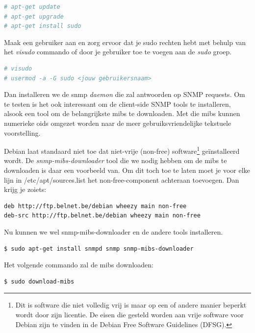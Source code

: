 \begin{lstlisting}[language=bash]
# apt-get update
# apt-get upgrade
# apt-get install sudo
\end{lstlisting}

Maak een gebruiker aan en zorg ervoor dat je sudo rechten hebt met behulp van het \textit{visudo} commando of door je gebruiker toe te voegen aan de \textit{sudo} groep.

\begin{lstlisting}[language=bash]
# visudo
# usermod -a -G sudo <jouw gebruikersnaam>
\end{lstlisting}

Dan installeren we de snmp \textit{daemon} die zal antwoorden op SNMP requests.
Om te testen is het ook interessant om de client-side SNMP tools te installeren, alsook een tool om de belangrijkste \glspl{mib} te downloaden.
Met die \glspl{mib} kunnen numerieke \glspl{oid} omgezet worden naar de meer gebruiksvriendelijke tekstuele voorstelling.

Debian laat standaard niet toe dat niet-vrije (non-free) software\footnote{
	Dit is software die niet volledig vrij is maar op een of andere manier beperkt wordt door zijn licentie. De eisen die gesteld worden aan vrije software voor Debian zijn te vinden in de Debian Free Software Guidelines (DFSG)\cite{dfsg}\cite{dfsg-wiki}.}
geïnstalleerd wordt. De \textit{snmp-mibs-downloader} tool die we nodig hebben om de \glspl{mib} te downloaden is daar een voorbeeld van.
Om dit toch toe te laten moet je voor elke lijn in /etc/apt/sources.list het non-free-component achteraan toevoegen.
Dan krijg je zoiets:

\begin{lstlisting}[language=bash]
deb http://ftp.belnet.be/debian wheezy main non-free
deb-src http://ftp.belnet.be/debian wheezy main non-free
\end{lstlisting}

Nu kunnen we wel snmp-mibs-downloader en de andere tools installeren.

\begin{lstlisting}[language=bash]
$ sudo apt-get install snmpd snmp snmp-mibs-downloader
\end{lstlisting}

Het volgende commando zal de \glspl{mib} downloaden:

\begin{lstlisting}[language=bash]
$ sudo download-mibs
\end{lstlisting}


